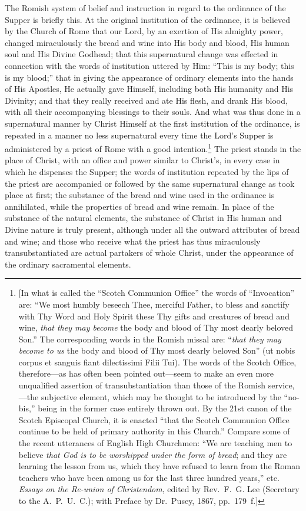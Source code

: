 \documentclass[
  english,
]{book}
\providecommand{\textlatin}{}
\renewcommand{\textlatin}[2][]{\foreignlanguage{latin}{#2}}
\begin{document}
The Romish system of belief and instruction in regard to the ordinance of the Supper is briefly this. At the original institution of the ordinance, it is believed by the Church of Rome that our Lord, by an exertion of His almighty power, changed miraculously the bread and wine into His body and blood, His human soul and His Divine Godhead; that this supernatural change was effected in connection with the words of institution uttered by Him: ``This is my body; this is my blood;'' that in giving the appearance of ordinary elements into the hands of His Apostles, He actually gave Himself, including both His humanity and His Divinity; and that they really received and ate His flesh, and drank His blood, with all their accompanying blessings to their souls. And what was thus done in a supernatural manner by Christ Himself at the first institution of the ordinance, is repeated in a manner no less supernatural every time the Lord's Supper is administered by a priest of Rome with a good intention.\footnote{{[}In what is called the ``Scotch Communion Office'' the words of ``Invocation'' are: ``We most humbly beseech Thee, merciful Father, to bless and sanctify with Thy Word and Holy Spirit these Thy gifts and creatures of bread and wine, \emph{that they may become} the body and blood of Thy most dearly beloved Son.'' The corresponding words in the Romish missal are: ``\emph{that they may become to us} the body and blood of Thy most dearly beloved Son'' (\textlatin{ut nobis corpus et sanguis fiant dilectissimi Filii Tui}). The words of the Scotch Office, therefore---as has often been pointed out---seem to make an even more unqualified assertion of transubstantiation than those of the Romish service,---the subjective element, which may be thought to be introduced by the ``\textlatin{nobis},'' being in the former case entirely thrown out. By the 21st canon of the Scotch Episcopal Church, it is enacted ``that the Scotch Communion Office continue to be held of primary authority in this Church.'' Compare some of the recent utterances of English High Churchmen: ``We are teaching men to believe \emph{that God is to be worshipped under the form of bread}; and they are learning the lesson from us, which they have refused to learn from the Roman teachers who have been among us for the last three hundred years,'' etc. \emph{Essays on the Re-union of Christendom}, edited by Rev.~F.~G. Lee (Secretary to the A.~P.~U.~C.); with Preface by Dr.~Pusey, 1867, pp.~179~f.{]}} The priest stands in the place of Christ, with an office and power similar to Christ's, in every case in which he dispenses the Supper; the words of institution repeated by the lips of the priest are accompanied or followed by the same supernatural change as took place at first; the substance of the bread and wine used in the ordinance is annihilated, while the properties of bread and wine remain. In place of the substance of the natural elements, the substance of Christ in His human and Divine nature is truly present, although under all the outward attributes of bread and wine; and those who receive what the priest has thus miraculously transubstantiated are actual partakers of whole Christ, under the appearance of the ordinary sacramental elements.
\end{document}
